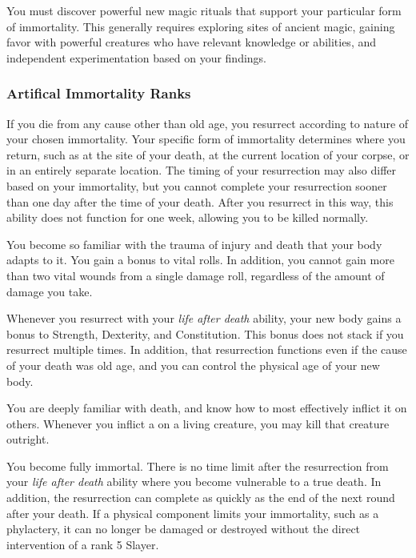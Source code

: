          You must discover powerful new magic rituals that support your particular form of immortality. This generally requires exploring sites of ancient magic, gaining favor with powerful creatures who have relevant knowledge or abilities, and independent experimentation based on your findings.

        \subsubsection{Artifical Immortality Ranks}

             If you die from any cause other than old age, you resurrect according to nature of your chosen immortality. Your specific form of immortality determines where you return, such as at the site of your death, at the current location of your corpse, or in an entirely separate location. The timing of your resurrection may also differ based on your immortality, but you cannot complete your resurrection sooner than one day after the time of your death. After you resurrect in this way, this ability does not function for one week, allowing you to be killed normally.

             You become so familiar with the trauma of injury and death that your body adapts to it.
            You gain a  bonus to vital rolls.
            In addition, you cannot gain more than two vital wounds from a single damage roll, regardless of the amount of damage you take.

             Whenever you resurrect with your \textit{life after death} ability, your new body gains a  bonus to Strength, Dexterity, and Constitution. This bonus does not stack if you resurrect multiple times. In addition, that resurrection functions even if the cause of your death was old age, and you can control the physical age of your new body.

             You are deeply familiar with death, and know how to most effectively inflict it on others.
            Whenever you inflict a  on a living creature, you may kill that creature outright.

             You become fully immortal. There is no time limit after the resurrection from your \textit{life after death} ability where you become vulnerable to a true death. In addition, the resurrection can complete as quickly as the end of the next round after your death. If a physical component limits your immortality, such as a phylactery, it can no longer be damaged or destroyed without the direct intervention of a rank 5 Slayer.

